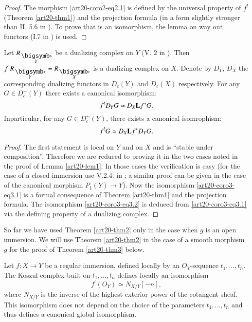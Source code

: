 \begin{proof}
The morphism \eqref{art20-coro2-eq2.1} is defined by the universal property of $f^{!}$ (Theorem \ref{art20-thm1}) and the projection formula (in a form slightly stronger than II. 5.6 in \cite{art20-key1}). To prove that is an isomorphism, the lemma on way out functors (I.7 in \cite{art20-key1}) is used.
\end{proof}

\begin{corollary}\label{art20-coro3}
Let $R_{\overdot{Y}}$ be a dualizing complex on $Y$ (V. $2$ in \cite{art20-key1}). Then $f^{!}R_{\overdot{Y}}=R_{\overdot{X}}$ is a dualizing complex on $X$. Denote by $D_{Y}$, $D_{X}$ the corresponding dualizing functors in $D_{c}(Y)$ and $D_{c}(X)$ respectively. For any $G\in D^{-}_{c}(Y)$ there exists a canonical isomorphism:
\setcounter{equation}{0}
\setcounter{section}{3}
\begin{equation}
f^{!}D_{Y}G\simeq D_{X}\mathbf{L} f^{*}G.\label{art20-coro3-eq3.1}
\end{equation}
In\pageoriginale particular, for any $G\in D^{+}_{c}(Y)$, there exists a canonical isomrophism:
\begin{equation}
f^{!}G\simeq D_{X}\mathbf{L} f^{*}D_{Y}G.\label{art20-coro3-eq3.2}
\end{equation}
\end{corollary}

\begin{proof}
The first statement is local on $Y$ and on $X$ and is ``stable under composition''. Therefore we are reduced to proving it in the two cases noted in the proof of Lemma \ref{art20-lem1}. In those cases the verification is easy (for the case of a closed immersion use V.2.4. in \cite{art20-key1}; a similar proof can be given in the case of the canonical morphism $P_{1}(Y)\to Y$). Now the isomorphism \eqref{art20-coro3-eq3.1} is a formal consequence of Theorem \ref{art20-thm1} and the projection formula. The isomorphism \eqref{art20-coro3-eq3.2} is deduced from \eqref{art20-coro3-eq3.1} via the defining property of a dualizing complex.
\end{proof}

So far we have used Theorem \ref{art20-thm2} only in the case when $g$ is an open immersion. We will use Theorem \ref{art20-thm2} in the case of a smooth morphism $g$ for the proof of Theorem \ref{art20-thm3} below.

\setcounter{proposition}{0}
\begin{proposition}\label{art20-sec2-prop1}
Let $f:X\to Y$ be a regular immersion, defined locally by an $O_{Y}$-sequence $t_{1},\ldots,t_{n}$. The Koszul complex built on $t_{1},\ldots,t_{n}$ defines locally an isomorphism
$$
f^{!}(O_{Y})\simeq N_{X/Y}[-n],
$$
where $N_{X/Y}$ is the inverse of the highest exterior power of the cotangent sheaf. This isomorphism does not depend on the choice of the parameters $t_{1},\ldots,t_{n}$ and thus defines a canonical global isomorphism.
\end{proposition}

